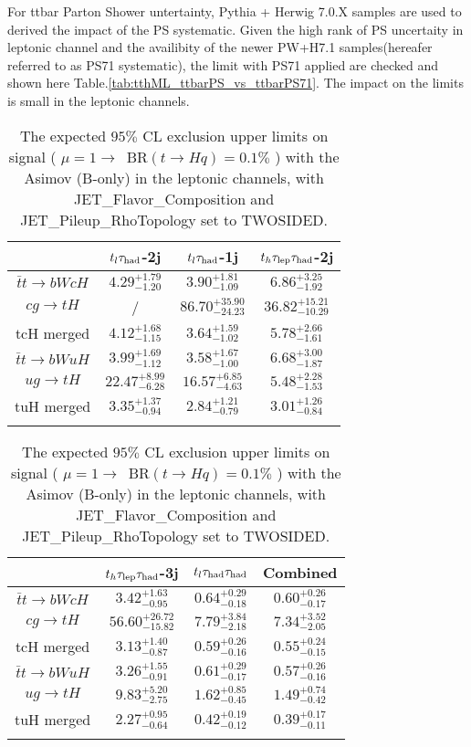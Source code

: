 For ttbar Parton Shower untertainty, Pythia + Herwig 7.0.X samples are used to derived the impact of the PS systematic. Given the high rank of PS uncertaity in leptonic channel and the availibity of the newer PW+H7.1 samples(hereafer referred to as PS71 systematic), the limit with PS71 applied are checked and shown here Table.\ref{tab:tthML_ttbarPS_vs_ttbarPS71}. The impact on the limits is small in the leptonic channels. 

\begin{table}
\caption{The expected $95\%$ CL exclusion upper limits on signal ( $\mu=1\to$~BR$(t\to Hq)=0.1\%$ ) with the Asimov (B-only) in the leptonic channels,  with JET\_Flavor\_Composition and JET\_Pileup\_RhoTopology set to TWOSIDED.}
\label{tab:tthML_max_vs_twosided}
\centering
\begin{tabular}{cccc} \toprule\toprule
 & $t_l\tau_\text{had}$-2j & $t_l\tau_\text{had}$-1j & $t_h\tau_\text{lep}{}\tau_\text{had}$-2j\\\midrule
$\bar{t}t\to bWcH$ & $4.29^{+1.79}_{-1.20}$ & $3.90^{+1.81}_{-1.09}$ & $6.86^{+3.25}_{-1.92}$\\
$cg\to tH$ &  / & $86.70^{+35.90}_{-24.23}$ & $36.82^{+15.21}_{-10.29}$\\
tcH merged & $4.12^{+1.68}_{-1.15}$ & $3.64^{+1.59}_{-1.02}$ & $5.78^{+2.66}_{-1.61}$\\
$\bar{t}t\to bWuH$ & $3.99^{+1.69}_{-1.12}$ & $3.58^{+1.67}_{-1.00}$ & $6.68^{+3.00}_{-1.87}$\\
$ug\to tH$ & $22.47^{+8.99}_{-6.28}$ & $16.57^{+6.85}_{-4.63}$ & $5.48^{+2.28}_{-1.53}$\\
tuH merged & $3.35^{+1.37}_{-0.94}$ & $2.84^{+1.21}_{-0.79}$ & $3.01^{+1.26}_{-0.84}$\\
\bottomrule\bottomrule\\
\end{tabular}
\begin{tabular}{cccc} \toprule\toprule
 & $t_h\tau_\text{lep}{}\tau_\text{had}$-3j & $t_l\tau_\text{had}{}\tau_\text{had}$ & Combined\\\midrule
$\bar{t}t\to bWcH$ & $3.42^{+1.63}_{-0.95}$ & $0.64^{+0.29}_{-0.18}$ & $0.60^{+0.26}_{-0.17}$\\
$cg\to tH$ & $56.60^{+26.72}_{-15.82}$ & $7.79^{+3.84}_{-2.18}$ & $7.34^{+3.52}_{-2.05}$\\
tcH merged & $3.13^{+1.40}_{-0.87}$ & $0.59^{+0.26}_{-0.16}$ & $0.55^{+0.24}_{-0.15}$\\
$\bar{t}t\to bWuH$ & $3.26^{+1.55}_{-0.91}$ & $0.61^{+0.29}_{-0.17}$ & $0.57^{+0.26}_{-0.16}$\\
$ug\to tH$ & $9.83^{+5.20}_{-2.75}$ & $1.62^{+0.85}_{-0.45}$ & $1.49^{+0.74}_{-0.42}$\\
tuH merged & $2.27^{+0.95}_{-0.64}$ & $0.42^{+0.19}_{-0.12}$ & $0.39^{+0.17}_{-0.11}$\\
\bottomrule\bottomrule\\
\end{tabular}
\end{table}


